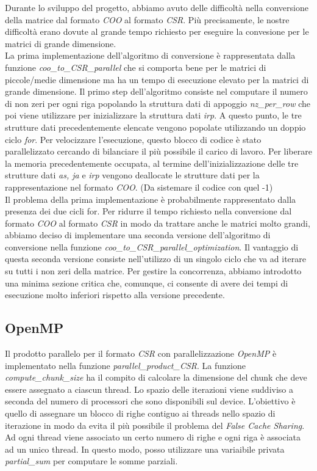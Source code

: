 \documentclass{article}
\begin{document}
Durante lo sviluppo del progetto, abbiamo avuto delle difficoltà nella conversione della matrice dal formato \textit{COO} al formato \textit{CSR}. Più precisamente, le nostre difficoltà erano dovute al grande tempo richiesto per eseguire la convesione per le matrici di grande dimensione.\\
La prima implementazione dell'algoritmo di conversione è rappresentata dalla funzione \textit{coo\_to\_CSR\_parallel} che si comporta bene per le matrici di piccole/medie dimensione ma ha un tempo di esecuzione elevato per la matrici di grande dimensione. Il primo step dell'algoritmo consiste nel computare il numero di non zeri per ogni riga popolando la struttura dati di appoggio \textit{nz\_per\_row} che poi viene utilizzare per inizializzare la struttura dati \textit{irp}. A questo punto, le tre strutture dati precedentemente elencate vengono popolate utilizzando un doppio ciclo \textit{for}. Per velocizzare l'esecuzione, questo blocco di codice è stato parallelizzato cercando di bilanciare il più possibile il carico di lavoro. Per liberare la memoria precedentemente occupata, al termine dell'inizializzazione delle tre strutture dati \textit{as, ja} e \textit{irp} vengono deallocate le strutture dati per la rappresentazione nel formato \textit{COO}. (Da sistemare il codice con quel -1)\\
Il problema della prima implementazione è probabilmente rappresentato dalla presenza dei due cicli for. Per ridurre il tempo richiesto nella conversione dal formato \textit{COO} al formato \textit{CSR} in modo da trattare anche le matrici molto grandi, abbiamo deciso di implementare una seconda versione dell'algoritmo di conversione nella funzione \textit{coo\_to\_CSR\_parallel\_optimization}. Il vantaggio di questa seconda versione consiste nell'utilizzo di un singolo ciclo che va ad iterare su tutti i non zeri della matrice. Per gestire la concorrenza, abbiamo introdotto una minima sezione critica che, comunque, ci consente di avere dei tempi di esecuzione molto inferiori rispetto alla versione precedente.

\subsection{OpenMP}
Il prodotto parallelo per il formato \textit{CSR} con parallelizzazione \textit{OpenMP} è implementato nella funzione \textit{parallel\_product\_CSR}. La funzione \textit{compute\_chunk\_size} ha il compito di calcolare la dimensione del chunk che deve essere assegnato a ciascun thread. Lo spazio delle iterazioni viene suddiviso a seconda del numero di processori che sono disponibili sul device. L'obiettivo è quello di assegnare un blocco di righe contiguo ai threads nello spazio di iterazione in modo da evita il più possibile il problema del \textit{False Cache Sharing}. Ad ogni thread viene associato un certo numero di righe e ogni riga è associata ad un unico thread. In questo modo, posso utilizzare una variaibile privata \textit{partial\_sum} per computare le somme parziali.
\end{document}
